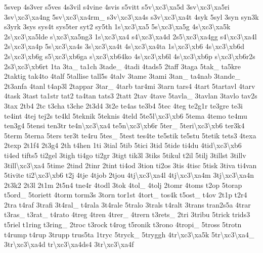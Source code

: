 {5svep 4s3ver s5ves 4s3vil s4vine 4svis s5vitt s5v\textbackslash{}xc3\textbackslash{}xa5d 3sv\textbackslash{}xc3\textbackslash{}xa5ri 3sv\textbackslash{}xc3\textbackslash{}xa4ng 5sv\textbackslash{}xc3\textbackslash{}xa4rm\-\_\- s3v\textbackslash{}xc3\textbackslash{}xa4s s3v\textbackslash{}xc3\textbackslash{}xa4t 4syk 5syl 3syn syn3k s3yrk 3sys sys4t sys5ter syt2 sy5th 1s\textbackslash{}xc3\textbackslash{}xa5 5s\textbackslash{}xc3\textbackslash{}xa5g 4s\textbackslash{}xc3\textbackslash{}xa5k 2s\textbackslash{}xc3\textbackslash{}xa5lde s\textbackslash{}xc3\textbackslash{}xa5ng3 1s\textbackslash{}xc3\textbackslash{}xa4 s4\textbackslash{}xc3\textbackslash{}xa4d 2s5\textbackslash{}xc3\textbackslash{}xa4gg s4\textbackslash{}xc3\textbackslash{}xa4l 2s\textbackslash{}xc3\textbackslash{}xa4p 5s\textbackslash{}xc3\textbackslash{}xa4s 3s\textbackslash{}xc3\textbackslash{}xa4t 4s\textbackslash{}xc3\textbackslash{}xa4ta 1s\textbackslash{}xc3\textbackslash{}xb6 4s\textbackslash{}xc3\textbackslash{}xb6d 2s\textbackslash{}xc3\textbackslash{}xb6g s5\textbackslash{}xc3\textbackslash{}xb6ga s\textbackslash{}xc3\textbackslash{}xb64ko 4s\textbackslash{}xc3\textbackslash{}xb6l 4s\textbackslash{}xc3\textbackslash{}xb6p s\textbackslash{}xc3\textbackslash{}xb6r2s 2s3\textbackslash{}xc3\textbackslash{}xb6rt 1ta 3ta\-\_\- ta1ch 3tade\-\_\- 4tadi 4tads5 2taff 3taga 5tak\-\_\- ta5kre 2taktig tak4to 4talf 5tallise tall5s 4talv 3tame 3tami 3tan\-\_\- ta4nab 3tande\-\_\- 2t3anfa 4tanl t4ap3l 2tappar 3tar\-\_\- 4tarb tar4mi 3tarn tars4 4tart 5tartavl 4tarv 4task 3tast ta1str tat2 ta4tan tats3 2tatt 2tav 4tave 5tavla\-\_\- 3tavlan 3tavlo tav2s 3tax 2tb4 2tc t3cha t3che 2t3d4 3t2e te4as te3b4 5tec 4teg te2g1r te3gre te3i te4int 4tej tej2s te4kl 5teknik 5teknis 4teld 5te5l\textbackslash{}xc3\textbackslash{}xb6 5tema 4temo te4mu ten3g4 5tensi ten3tr te4n\textbackslash{}xc3\textbackslash{}xa4 te5n\textbackslash{}xc3\textbackslash{}xb6r 5ter\-\_\- 5teri\textbackslash{}xc3\textbackslash{}xb6 ter3k4 5term 5terna 5ters ter3t te4ru 5tes\-\_\- 5test tes4te te5stik te5stu 5tetik tets3 4texa 2texp 2t1f4 2t3g4 2th t4hen 1ti 3tial 5tib 5tici 3tid 5tide ti4du 4tid\textbackslash{}xc3\textbackslash{}xb6 ti4ed tifts5 ti2gel 3tigh ti4go ti2gr 3tigt tik3l 3tiks 5tikul t2il 5tilj 3tillst 3tillv 3till\textbackslash{}xc3\textbackslash{}xa4 5time 2tind 2tinr 2tint ti4od 3tion ti2os 3tis 4tisc 5tisk 3tiva ti4van 5tivite ti2\textbackslash{}xc3\textbackslash{}xb6 t2j 4tje 4tjob 2tjou 4tj\textbackslash{}xc3\textbackslash{}xa4l 4tj\textbackslash{}xc3\textbackslash{}xa4m 3tj\textbackslash{}xc3\textbackslash{}xa4n 2t3k2 2t3l 2t1m 2t5n4 tne4r 4todl 3tok 4tol\-\_\- 4tolj 2tomr 4toms t2op 5torap t5ord\-\_\- 5toriett 4torm torm3s 3torn tor1st 4tort\-\_\- tos4k t5ost\-\_\- t4ov 2t1p t2r4 2tra t4raf 3trafi 3t4ral\-\_\- t4rala 3t4rale 5tralo 3trals t4ralt 3trans tran2s5a 4trar t3ras\-\_\- t3rat\-\_\- t4rato 4treg 4tren 4trer\-\_\- 4trern t3rets\-\_\- 2tri 3tribu 5trick trids3 t5riel t1ring t3ring\-\_\- 2troc t3rock t4rog t5ronik t3rono 4tropi\-\_\- 5tross 5trotn t4rump t4rup 3trupp trus5ta 1tryc 5tryck\-\_\- 5tryggh 4tr\textbackslash{}xc3\textbackslash{}xa5k 5tr\textbackslash{}xc3\textbackslash{}xa4\-\_\- 3tr\textbackslash{}xc3\textbackslash{}xa4d tr\textbackslash{}xc3\textbackslash{}xa4ds4 3tr\textbackslash{}xc3\textbackslash{}xa4f }

